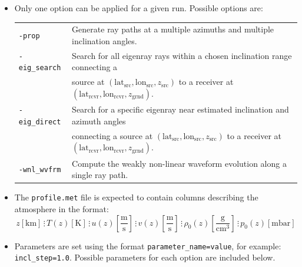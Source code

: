 \documentclass[10pt]{article}
\begin{document}
\begin{itemize}
 \item Only one option can be applied for a given run.  Possible options are:

\begin{tabular}{  l l }
  \verb=-prop=		& Generate ray paths at a multiple azimuths and multiple inclination angles. \\
  \verb=-eig_search=	& Search for all eigenray rays within a chosen inclination range connecting a \\
 				& \hspace{5pt} source at \( \left( \text{lat}_\text{src}, \text{lon}_\text{src}, z_\text{src} \right)\) to a receiver at \( \left( \text{lat}_\text{rcvr}, \text{lon}_\text{rcvr}, z_\text{grnd} \right) \). \\
 \verb=-eig_direct=	& Search for a specific eigenray near estimated inclination and azimuth angles \\
   				& \hspace{5pt} connecting a source at \( \left( \text{lat}_\text{src}, \text{lon}_\text{src}, z_\text{src} \right)\) to a receiver at \( \left( \text{lat}_\text{rcvr}, \text{lon}_\text{rcvr}, z_\text{grnd} \right) \). \\
  \verb=-wnl_wvfrm=	& Compute the weakly non-linear waveform evolution along a single ray path.
 \end{tabular}
 
 \item The \verb=profile.met= file is expected to contain columns describing the atmosphere in the format:
\begin{equation*} 
 z \left[ \text{km} \right] \hspace{2pt} \vdots \hspace{2pt}
 T(z) \left[ \text{K} \right] \hspace{2pt} \vdots \hspace{2pt}
 u(z) \left[ \frac{\text{m}}{\text{s}} \right] \hspace{2pt} \vdots \hspace{2pt}
 v(z) \left[ \frac{\text{m}}{\text{s}} \right] \hspace{2pt} \vdots \hspace{2pt}
 \rho_0(z) \left[ \frac{\text{g}}{\text{cm}^3} \right] \hspace{2pt} \vdots \hspace{2pt}
 p_0(z) \left[ \text{mbar} \right] 
\end{equation*}
 \item Parameters are set using the format \verb#parameter_name=value#, for example: \verb#incl_step=1.0#.  Possible parameters for each option are included below.
 \end{itemize}
\end{document}
